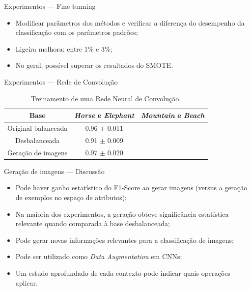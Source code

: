 \documentclass[10pt]{beamer}
\begin{document}
\begin{frame}{Experimentos --- Fine tunning}
  \setlength\leftmargini{1em}
  \begin{itemize}
    \item Modificar parâmetros dos métodos e verificar a diferença do desempenho da classificação com os parâmetros padrões;
    \item Ligeira melhora: entre 1\% e 3\%;
    \item No geral, possível superar os resultados do SMOTE.
  \end{itemize}
\end{frame}
\begin{frame}{Experimentos --- Rede de Convolução}
  \setlength\leftmargini{1em}
  \begin{table}
    \caption{Treinamento de uma Rede Neural de Convolução.}
    \begin{tabular}{c|c|c}
      Base                    &  \textit{Horse} e \textit{Elephant} & \textit{Mountain} e \textit{Beach}  \\ \hline
      Original balanceada     &  0.96 $\pm$ 0.011 \\
      Desbalanceada           &  0.91 $\pm$ 0.009 \\
      Geração de imagens      &  0.97 $\pm$ 0.020 \\
    \end{tabular}
  \end{table}
\end{frame}
\begin{frame}{Geração de imagens --- Discussão}
  \setlength\leftmargini{1em}
  \begin{itemize}
    \item Pode haver ganho estatístico do F1-Score ao gerar imagens (versus a geração de exemplos no espaço de atributos);
    \item Na maioria dos experimentos, a geração obteve significância estatística relevante quando comparada à base desbalanceada;
    \item Pode gerar novas informações relevantes para a classificação de imagens;
    \item Pode ser utilizado como \textit{Data Augmentation} em CNNs;
    \item Um estudo aprofundado de cada contexto pode indicar quais operações aplicar.
  \end{itemize}
\end{frame}
\end{document}
